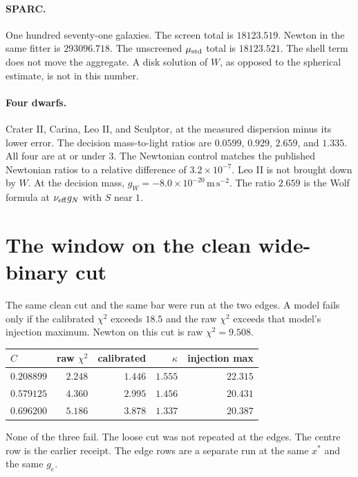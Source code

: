\paragraph{SPARC.}
One hundred seventy-one galaxies. The screen total is \(18123.519\). Newton in the same fitter is \(293096.718\). The unscreened \(\mu_{\rm std}\) total is \(18123.521\). The shell term does not move the aggregate. A disk solution of \(W\), as opposed to the spherical estimate, is not in this number.

\paragraph{Four dwarfs.}
Crater II, Carina, Leo II, and Sculptor, at the measured dispersion minus its lower error. The decision mass-to-light ratios are \(0.0599\), \(0.929\), \(2.659\), and \(1.335\). All four are at or under \(3\). The Newtonian control matches the published Newtonian ratios to a relative difference of \(3.2\times10^{-7}\). Leo II is not brought down by \(W\). At the decision mass, \(g_W=-8.0\times10^{-20}\,\mathrm{m\,s^{-2}}\). The ratio \(2.659\) is the Wolf formula at \(\nu_{\rm eff} g_N\) with \(S\) near \(1\).

\section{The window on the clean wide-binary cut}

The same clean cut and the same bar were run at the two edges. A model fails only if the calibrated \(\chi^2\) exceeds \(18.5\) and the raw \(\chi^2\) exceeds that model's injection maximum. Newton on this cut is raw \(\chi^2=9.508\).

\begin{center}
\begin{tabular}{lrrrr}
\hline
\(C\) & raw \(\chi^2\) & calibrated & \(\kappa\) & injection max \\
\hline
\(0.208899\) & \(2.248\) & \(1.446\) & \(1.555\) & \(22.315\) \\
\(0.579125\) & \(4.360\) & \(2.995\) & \(1.456\) & \(20.431\) \\
\(0.696200\) & \(5.186\) & \(3.878\) & \(1.337\) & \(20.387\) \\
\hline
\end{tabular}
\end{center}

None of the three fail. The loose cut was not repeated at the edges. The centre row is the earlier receipt. The edge rows are a separate run at the same \(x^*\) and the same \(g_e\).

